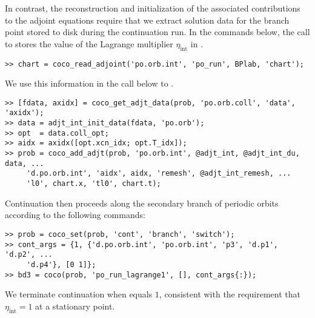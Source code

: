 In contrast, the reconstruction and initialization of the associated contributions to the adjoint equations require that we extract solution data for the branch point stored to disk during the  continuation run. In the commands below, the call to  stores the value of the Lagrange multiplier $\eta_\mathrm{int}$ in .
\begin{lstlisting}[language=coco-highlight]
>> chart = coco_read_adjoint('po.orb.int', 'po_run', BPlab, 'chart');
\end{lstlisting}
We use this information in the call below to .
\begin{lstlisting}[language=coco-highlight]
>> [fdata, axidx] = coco_get_adjt_data(prob, 'po.orb.coll', 'data', 'axidx');
>> data = adjt_int_init_data(fdata, 'po.orb');
>> opt  = data.coll_opt;
>> aidx = axidx([opt.xcn_idx; opt.T_idx]);
>> prob = coco_add_adjt(prob, 'po.orb.int', @adjt_int, @adjt_int_du, data, ...
     'd.po.orb.int', 'aidx', aidx, 'remesh', @adjt_int_remesh, ...
     'l0', chart.x, 'tl0', chart.t);
\end{lstlisting}
Continuation then proceeds along the secondary branch of periodic orbits according to the following commands:
\begin{lstlisting}[language=coco-highlight]
>> prob = coco_set(prob, 'cont', 'branch', 'switch');
>> cont_args = {1, {'d.po.orb.int', 'po.orb.int', 'p3', 'd.p1', 'd.p2', ...
     'd.p4'}, [0 1]};
>> bd3 = coco(prob, 'po_run_lagrange1', [], cont_args{:});
\end{lstlisting}
We terminate continuation when  equals $1$, consistent with the requirement that $\eta_\mathrm{int}=1$ at a stationary point.

